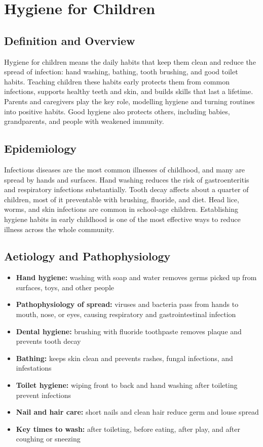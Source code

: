 \chapter{Hygiene for Children}

\section*{Definition and Overview}
Hygiene for children means the daily habits that keep them clean and reduce the spread of infection: hand washing, bathing, tooth brushing, and good toilet habits. Teaching children these habits early protects them from common infections, supports healthy teeth and skin, and builds skills that last a lifetime. Parents and caregivers play the key role, modelling hygiene and turning routines into positive habits. Good hygiene also protects others, including babies, grandparents, and people with weakened immunity.

\section*{Epidemiology}
Infectious diseases are the most common illnesses of childhood, and many are spread by hands and surfaces. Hand washing reduces the risk of gastroenteritis and respiratory infections substantially. Tooth decay affects about a quarter of children, most of it preventable with brushing, fluoride, and diet. Head lice, worms, and skin infections are common in school-age children. Establishing hygiene habits in early childhood is one of the most effective ways to reduce illness across the whole community.

\section*{Aetiology and Pathophysiology}
\begin{itemize}
    \item \textbf{Hand hygiene:} washing with soap and water removes germs picked up from surfaces, toys, and other people
    \item \textbf{Pathophysiology of spread:} viruses and bacteria pass from hands to mouth, nose, or eyes, causing respiratory and gastrointestinal infection
    \item \textbf{Dental hygiene:} brushing with fluoride toothpaste removes plaque and prevents tooth decay
    \item \textbf{Bathing:} keeps skin clean and prevents rashes, fungal infections, and infestations
    \item \textbf{Toilet hygiene:} wiping front to back and hand washing after toileting prevent infections
    \item \textbf{Nail and hair care:} short nails and clean hair reduce germ and louse spread
    \item \textbf{Key times to wash:} after toileting, before eating, after play, and after coughing or sneezing
\end{itemize}

